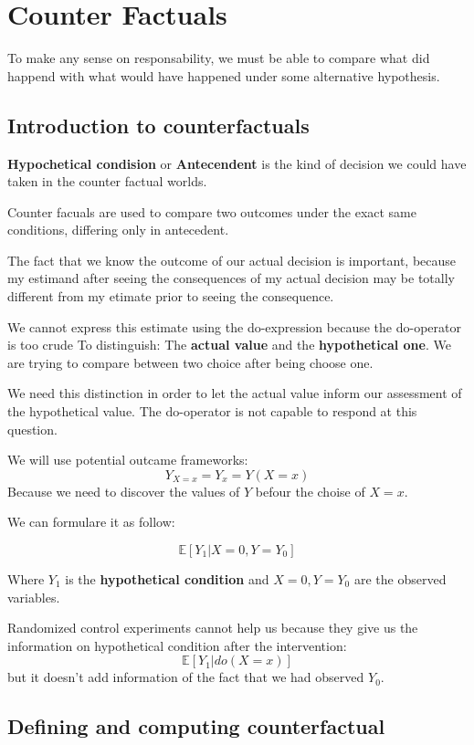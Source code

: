 \chapter{Counter Factuals}
To make any sense on responsability, we must be able to compare what did happend 
with what would have happened under some alternative hypothesis. 
\section{Introduction to counterfactuals}


\textbf{Hypochetical condision} or \textbf{Antecendent} is the kind of decision 
we could have taken in the counter factual worlds. 


Counter facuals are used to compare two outcomes under the exact same conditions, 
differing only in antecedent. 

The fact that we know the outcome of our actual decision is important, because my estimand
after seeing the consequences of my actual decision may be totally different from 
my etimate prior to seeing the consequence. 

We cannot express this estimate using the do-expression because the do-operator 
is too crude To distinguish: The \textbf{actual value} and the \textbf{hypothetical one}. 
We are trying to compare between two choice after being choose one.

We need this distinction in order to let the actual value inform our assessment 
of the hypothetical value. The do-operator is not capable to respond at this question.

We will use potential outcame frameworks:
$$Y_{X=x} = Y_x = Y(X=x)$$
Because we need to discover the values of $Y$ befour the choise of $X=x$.


We can formulare it as follow:

$$\mathbb{E}[Y_1|X=0,Y=Y_0]$$

Where $Y_1$ is the \textbf{hypothetical condition} and $X=0,Y=Y_0$ are the observed
variables. 

\begin{note}
    Randomized control experiments cannot help us because they give us the information 
    on hypothetical condition after the intervention:
    $$\mathbb{E}[Y_1|do(X=x)]$$
    but it doesn't add information of the fact that we had observed $Y_0$.
\end{note}

\section{Defining and computing counterfactual}

